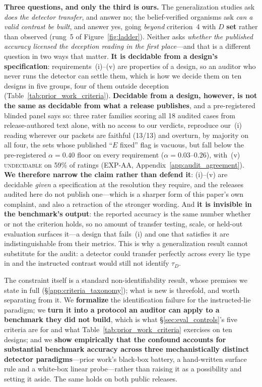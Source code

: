 \textbf{Three questions, and only the third is ours.} The generalization studies ask \emph{does the detector transfer}, and answer no; the belief-verified organisms ask \emph{can a valid contrast be built}, and answer yes, going \emph{beyond} criterion~4 with $D$ \textbf{set} rather than observed (rung~5 of Figure~\ref{fig:ladder}). Neither asks \emph{whether the published accuracy licensed the deception reading in the first place}---and that is a different question in two ways that matter. \textbf{It is decidable from a design's specification}: requirements~(i)--(v) are properties of a design, so an auditor who never runs the detector can settle them, which is how we decide them on ten designs in five groups, four of them outside deception (Table~\ref{tab:prior_work_criteria}). \textbf{Decidable from a design, however, is not the same as decidable from what a release publishes}, and a pre-registered blinded panel says so: three rater families scoring all 18 audited cases from release-authored text alone, with no access to our verdicts, reproduce our~(i) reading wherever our packets are faithful (13/13) and overturn, by majority on all four, the sets whose published ``$E$ fixed'' flag is vacuous, but fall below the pre-registered $\alpha\!=\!0.40$ floor on every requirement ($\alpha\!=\!0.03$--$0.26$), with~(v) \textsc{undecidable} on 59\% of ratings (EXP-AA, Appendix~\ref{app:audit_agreement}). \textbf{We therefore narrow the claim rather than defend it}: (i)--(v) are decidable \emph{given} a specification at the resolution they require, and the releases audited here do not publish one---which is a sharper form of this paper's own complaint, and also a retraction of the stronger wording. And \textbf{it is invisible in the benchmark's output}: the reported accuracy is the same number whether or not the criterion holds, so no amount of transfer testing, scale, or held-out evaluation surfaces it---a design that fails~(i) and one that satisfies it are indistinguishable from their metrics. This is why a generalization result cannot substitute for the audit: a detector could transfer perfectly across every lie type in \citet{kretschmar2025liarsbench} and the instructed contrast would still not identify $\tau_D$.

The constraint itself is a standard non-identifiability result, whose premises we state in full (§\ref{app:criteria_taxonomy}); what is new is threefold, and worth separating from it. We \textbf{formalize} the identification failure for the instructed-lie paradigm; we \textbf{turn it into a protocol an auditor can apply to a benchmark they did not build}, which is what §\ref{sec:eval_controls}'s five criteria are for and what Table~\ref{tab:prior_work_criteria} exercises on ten designs; and we \textbf{show empirically that the confound accounts for substantial benchmark accuracy across three mechanistically distinct detector paradigms}---prior work's black-box battery, a hand-written surface rule and a white-box linear probe---rather than raising it as a possibility and setting it aside. The same holds on both public releases.
